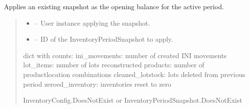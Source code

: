 \documentclass[a4paper,11pt,spanish]{sphinxmanual}
\begin{document}
\begin{fulllineitems}
\label{\detokenize{api/inventory/inventory.services:inventory.services.aplicar_snapshot_al_periodo_activo}}
\pysigstartsignatures
\pysiglinewithargsret
{}
{\sphinxparamcomma {}}
{}
\pysigstopsignatures
\sphinxAtStartPar
Applies an existing snapshot as the opening balance for the active period.
\begin{quote}\begin{description}
\begin{itemize}
\item {} 
\sphinxAtStartPar
{} – User instance applying the snapshot.

\item {} 
\sphinxAtStartPar
{} – ID of the InventoryPeriodSnapshot to apply.

\end{itemize}

\sphinxAtStartPar
dict with counts:
\sphinxhyphen{} ini\_movements: number of created INI movements
\sphinxhyphen{} lot\_items: number of lots reconstructed
\sphinxhyphen{} products: number of product\sphinxhyphen{}location combinations
\sphinxhyphen{} cleaned\_lotstock: lots deleted from previous period
\sphinxhyphen{} zeroed\_inventory: inventories reset to zero

\sphinxAtStartPar
InventoryConfig.DoesNotExist or InventoryPeriodSnapshot.DoesNotExist

\end{description}\end{quote}

\end{fulllineitems}

\end{document}

